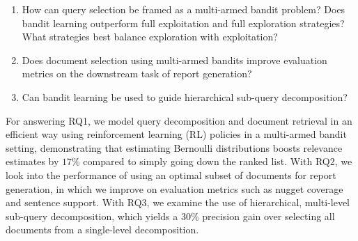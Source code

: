 
\begin{enumerate}[label=(RQ\arabic*),leftmargin=*,nosep]
    \item How can query selection be framed as a multi-armed bandit problem? Does bandit learning outperform full exploitation and full exploration strategies? What strategies best balance exploration with exploitation?
    \item Does document selection using multi-armed bandits improve evaluation metrics on the downstream task of report generation?
    \item Can bandit learning be used to guide hierarchical sub-query decomposition?
\end{enumerate}

\noindent%
For answering RQ1, we model query decomposition and document retrieval in an efficient way using reinforcement learning (RL) policies in a multi-armed bandit setting, demonstrating that estimating Bernoulli distributions boosts relevance estimates by \(17\%\) compared to simply going down the ranked list. With RQ2, we look into the performance of using an optimal subset of documents for report generation, in which we improve on evaluation metrics such as nugget coverage and sentence support. With RQ3, we examine the use of hierarchical, multi-level sub-query decomposition, which yields a \(30\%\) precision gain over selecting all documents from a single-level decomposition.